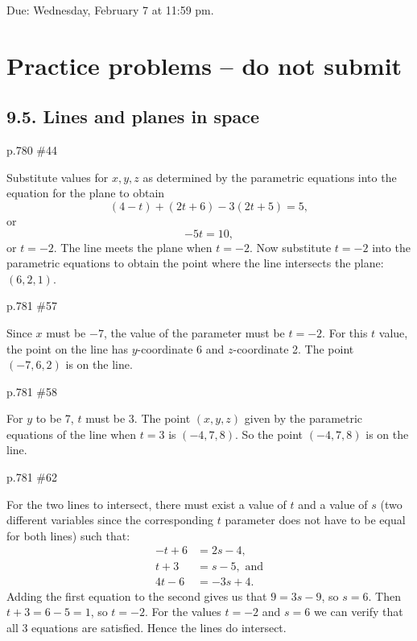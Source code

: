 \maketitle

Due: Wednesday, February 7 at 11:59 pm.

\section{Practice problems -- do not submit}
\subsection*{9.5. Lines and planes in space}
\begin{practice}p.780 \#44\end{practice}
\begin{pracsol}
  Substitute values for $x,y,z$ as determined by the parametric equations into the equation for the plane to obtain
  \[(4-t)+(2t+6)-3(2t+5)=5,\]
  or
  \[-5t=10,\]
  or $t=-2$. The line meets the plane when $t=-2$. Now substitute $t=-2$ into the parametric equations to obtain the point where the line intersects the plane: $(6,2,1)$.
\end{pracsol}
\begin{practice}p.781 \#57\end{practice}
\begin{pracsol}
  Since $x$ must be $-7$, the value of the parameter must be $t=-2$. For this $t$ value, the point on the line has $y$-coordinate 6 and $z$-coordinate 2. The point $(-7,6,2)$ is on the line.
\end{pracsol}
\begin{practice}p.781 \#58\end{practice}
\begin{pracsol}
  For $y$ to be 7, $t$ must be 3. The point $(x,y,z)$ given by the parametric equations of the line when $t=3$ is $(-4,7,8)$. So the point $(-4,7,8)$ is on the line.
\end{pracsol}
\begin{practice}p.781 \#62\end{practice}
\begin{pracsol}
  For the two lines to intersect, there must exist a value of $t$ and a value of $s$ (two different variables since the corresponding $t$ parameter does not have to be equal for both lines) such that:
  \begin{align*}
    -t+6 &= 2s-4,\\
    t+3 &= s-5,\text{ and}\\
    4t-6 &= -3s+4.
  \end{align*}
  Adding the first equation to the second gives us that $9=3s-9$, so $s=6$. Then $t+3=6-5=1$, so $t=-2$. For the values $t=-2$ and $s=6$ we can verify that all 3 equations are satisfied. Hence the lines do intersect.
\end{pracsol}
